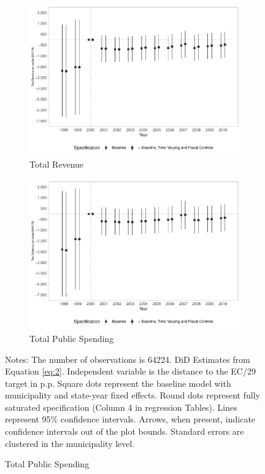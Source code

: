 \begin{figure}[h!]
    \begin{center}
    \caption{Fiscal Reactions}\label{fig:6}
    \begin{subfigure}{0.49\textwidth}
        \caption{\scriptsize Total Revenue}\label{fig:6a}
        \centering
        \includegraphics[width=\textwidth]{plots/finbra_reccorr_pcapita_dist_ec29_baseline_dist_ec29_baseline_6.pdf}
    \end{subfigure}
    \begin{subfigure}{0.49\textwidth}
        \centering
        \caption{\scriptsize Total Public Spending}\label{fig:6b}
        \includegraphics[width=\textwidth]{plots/finbra_desp_o_pcapita_dist_ec29_baseline_dist_ec29_baseline_6.pdf}
    \end{subfigure}
    
    \end{center}
    \scriptsize{Notes: The number of observations is 64224. DiD Estimates from Equation \ref{eq:2}. Independent variable is the distance to the EC/29 target in p.p. Square dots represent the baseline model with municipality and state-year fixed effects. Round dots represent fully saturated specification (Column 4 in regression Tables). Lines represent 95\% confidence intervals. Arrows, when present, indicate confidence intervals out of the plot bounds. Standard errors are clustered in the municipality level.}
    
\end{figure}